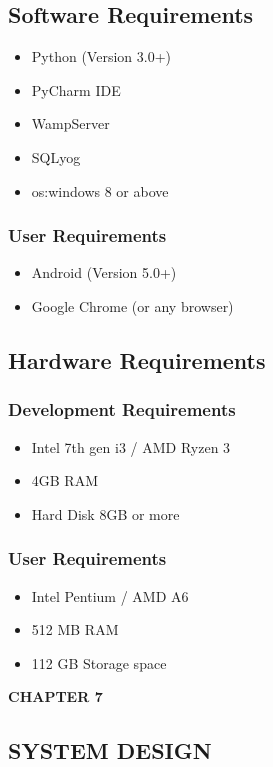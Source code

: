 \documentclass[12pt]{article}
\begin{document}
\begin{enumerate}
\subsection{Software Requirements}
\begin{itemize}
\item Python (Version 3.0+)
\item PyCharm IDE
\item WampServer
\item SQLyog
\item os:windows 8 or above
\end{itemize}

\subsubsection{User Requirements}
\begin{itemize}
\item Android (Version 5.0+)
\item Google Chrome (or any browser)
\end{itemize}

\subsection{Hardware Requirements}
\subsubsection{Development Requirements}
\begin{itemize}
\item Intel 7th gen i3 / AMD Ryzen 3
\item 4GB RAM
\item Hard Disk 8GB or more
\end{itemize}

\subsubsection{User Requirements}
\begin{itemize}
\item Intel Pentium / AMD A6
\item 512 MB RAM
\item 112 GB Storage space
\end{itemize}

\newpage
\begin{flushleft}\textbf{CHAPTER 7} \end{flushleft}
\begin{flushleft}\section{SYSTEM DESIGN} \end{flushleft}
\vspace*{10px}


\end{enumerate}
\end{document}
